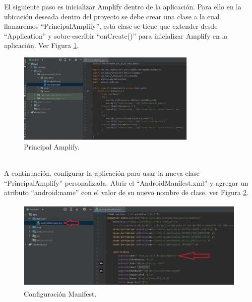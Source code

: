 \documentclass[a4paper,10pt, oneside, titlepage]{article}
\begin{document}
	\indent El siguiente paso es inicializar Amplify dentro de la aplicación. Para ello en la ubicación deseada dentro del proyecto se debe crear una clase a la cual llamaremos ``PrincipalAmplify'', esta clase se tiene que extender desde ``Application'' y sobre-escribir ``onCreate()'' para inicializar Amplify en la aplicación. Ver Figura \ref{Principal_Amplify}.
	\begin{figure}[!h]
		\centering
		\includegraphics[width = 1\linewidth, height = 4.4cm]{Principal_Amplify.png}
		\caption{Principal Amplify.}
		\label{Principal_Amplify}
	\end{figure} \\
	\indent A continuación, configurar la aplicación para usar la nueva clase ``PrincipalAmplify'' personalizada. Abrir el  ``AndroidManifest.xml'' y agregar un atributo ``android:name'' con el valor de su nuevo nombre de clase, ver Figura \ref{Manifest_Amplify}.
	\begin{figure}[!h]
		\centering
		\includegraphics[width = 1\linewidth, height = 4.4cm]{Manifest_Amplify.png}
		\caption{Configuración Manifest.}
		\label{Manifest_Amplify}
	\end{figure} 
\end{document}
